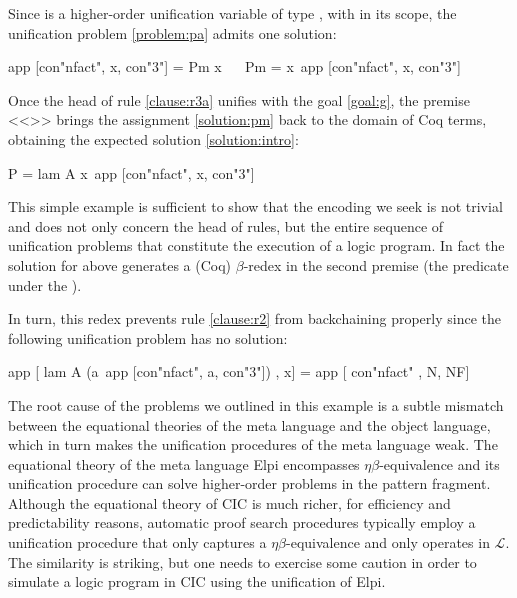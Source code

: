 \documentclass[sigconf,natbib=false,review]{acmart}
\newcommand{\llambda}{\ensuremath{\mathcal{L}}\xspace}
\begin{document}
\noindent
Since  is a higher-order unification variable
of type ,
with 
in its scope, the unification problem \ref{problem:pa}
admits one solution:

\begin{elpicode}
app [con"nfact", x, con"3"] = Pm x                    ~~
Pm = x\ app [con"nfact", x, con"3"]                   ~~
\end{elpicode}

\noindent
Once the head of rule \ref{clause:r3a} unifies with the goal \ref{goal:g},
the premise <<>> brings the assignment \ref{solution:pm}
back to the domain  of Coq terms, obtaining the expected solution
\ref{solution:intro}:

\begin{elpicode}
P = lam A x\ app [con"nfact", x, con"3"]
\end{elpicode}

\noindent
This simple example is sufficient to show that the encoding we seek
is not trivial and does not only concern the head of rules, but the entire sequence
of unification problems that constitute the execution of a logic program.
In fact
the solution for  above generates a
(Coq) $\beta$-redex in the second premise (the predicate
under the \hspace{-0.4em}).


In turn, this redex prevents rule \ref{clause:r2} from backchaining properly since
the following unification problem has no solution:

\begin{elpicode}
app [ lam A (a\ app [con"nfact", a, con"3"]) , x] =
app [ con"nfact"                             , N, NF]
\end{elpicode}

\noindent
The root cause of the problems we outlined in this example
is a subtle mismatch between the equational theories of the meta language
and the object language, which in turn makes the 
unification procedures of the meta language weak.
The equational theory of the meta language Elpi encompasses
$\eta\beta$-equivalence and its unification procedure can solve higher-order
problems in the pattern fragment. Although 
the equational theory of CIC is much richer, for efficiency and predictability
reasons, automatic proof search procedures typically employ a unification
procedure that only captures a $\eta\beta$-equivalence and only operates
in \llambda. The similarity is striking, but one needs to exercise some caution in order to
simulate a logic program in CIC using the unification of Elpi.
\end{document}
